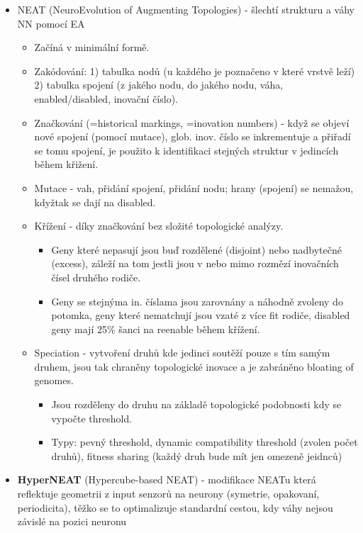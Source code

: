 \documentclass[a4paper,hidelinks]{article}
\begin{document}
\begin{itemize}
    \item NEAT (NeuroEvolution of Augmenting Topologies) - šlechtí strukturu a váhy NN pomocí EA
        \begin{itemize}
            \item Začíná v minimální formě.
            \item Zakódování: 1) tabulka nodů (u každého je poznačeno v které vrstvě leží) 2) tabulka spojení (z jakého nodu, do jakého nodu, váha, enabled/disabled, inovační číslo).
            \item Značkování (=historical markings, =inovation numbers) - když se objeví nové spojení (pomocí mutace), glob. inov. číslo se inkrementuje a přiřadí se tomu spojení, je použito k identifikaci stejných struktur v jedincích během křižení.
            \item Mutace - vah, přidání spojení, přidání nodu; hrany (spojení) se nemažou, kdyžtak se dají na disabled.
            \item Křížení - díky značkování bez složité topologické analýzy.
                \begin{itemize}
                    \item Geny které nepasují jsou buď rozdělené (disjoint) nebo nadbytečné (excess), záleží na tom jestli jsou v nebo mimo rozmězí inovačních čísel druhého rodiče.
                    \item Geny se stejnýma in. číslama jsou zarovnány a náhodně zvoleny do potomka, geny které nematchují jsou vzaté z více fit rodiče, disabled geny mají 25\% šanci na reenable během křížení.
                \end{itemize}
            \item Speciation - vytvoření druhů kde jedinci soutěží pouze s tím samým druhem, jsou tak chraněny topologické inovace a je zabráněno bloating of genomes.
                \begin{itemize}
                    \item Jsou rozděleny do druhu na základě topologické podobnosti kdy se vypočte threshold.
                    \item Typy: pevný threshold, dynamic compatibility threshold (zvolen počet druhů), fitness sharing (každý druh bude mít jen omezeně jeidnců) 
                \end{itemize}
        \end{itemize}
    \item \textbf{HyperNEAT} (Hypercube-based NEAT) - modifikace NEATu která reflektuje geometrii z input senzorů na neurony (symetrie, opakovaní, periodicita), těžko se to optimalizuje standardní cestou, kdy váhy nejsou závislé na pozici neuronu

\end{itemize}
\end{document}
